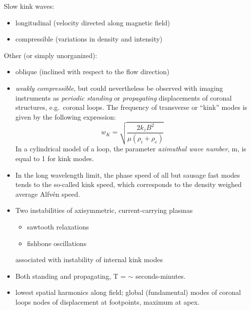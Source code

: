 \documentclass{article}
\begin{document}
Slow kink waves:
\begin{itemize}
    \item longitudinal (velocity directed along magnetic field)
    \item compressible (variations in density and intensity)
\end{itemize}

Other (or simply unorganized):
\begin{itemize}
    \item oblique (inclined with respect to the flow direction)
    \item \emph{weakly compressible}, but could nevertheless be
        observed with imaging instruments as \emph{periodic standing}
        or \emph{propagating} displacements of coronal structures, e.g.\ coronal loops.
        The frequency of transverse or ``kink'' modes is given by the following expression:
            $$ w_K = \sqrt{ \frac{2k_zB^2}{\mu(\rho_i+\rho_e)}  }   $$
        In a cylindrical model of a loop,
        the parameter \emph{azimuthal wave number},
        m, is equal to 1 for kink modes.
    \item In the long wavelength limit, the phase speed of all but
        sausage fast modes tends to the so-called kink speed,
        which corresponds to the density weighed average Alfv\'en speed.
    \item Two instabilities of axisymmetric, current-carrying plasmas
        \begin{itemize}
            \item sawtooth relaxations
            \item fishbone oscillations
        \end{itemize}
        associated with instability of internal kink modes
    \item Both standing and propagating, T = $\sim$ seconds-minutes.
    \item lowest spatial harmonics along field; global (fundamental)
        modes of coronal loops nodes of displacement at footpoints,
        maximum at apex.
\end{itemize}
\end{document}
